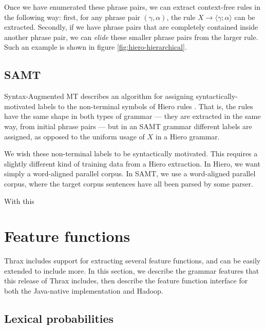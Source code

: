 \documentclass{pbml}
\begin{document}
Once we have enumerated these phrase pairs, we can extract context-free rules in the following way: first, for any phrase pair $(\gamma,\alpha)$, the rule $X \to \langle \gamma ; \alpha \rangle$ can be extracted. Secondly, if we have phrase pairs that are completely contained inside another phrase pair, we can {\em elide} these smaller phrase pairs from the larger rule. Such an example is shown in figure \ref{fig:hiero-hierarchical}.

\subsection{SAMT}

Syntax-Augmented MT describes an algorithm for assigning syntactically-motivated labels to the non-terminal symbols of Hiero rules \cite{samt2006}. That is, the rules have the same shape in both types of grammar --- they are extracted in the same way, from initial phrase pairs --- but in an SAMT grammar different labels are assigned, as opposed to the uniform usage of $X$ in a Hiero grammar.

We wish these non-terminal labels to be syntactically motivated. This requires a slightly different kind of training data from a Hiero extraction. In Hiero, we want simply a word-aligned parallel corpus. In SAMT, we use a word-aligned parallel corpus, where the target corpus sentences have all been parsed by some parser.

With this

\section{Feature functions}
\label{sec:features}

Thrax includes support for extracting several feature functions, and can be easily extended to include more. In this section, we describe the grammar features that this release of Thrax includes, then describe the feature function interface for both the Java-native implementation and Hadoop.

\subsection{Lexical probabilities}
\end{document}

